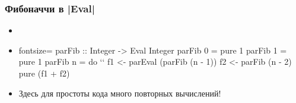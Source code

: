 \documentclass[11pt]{beamer}
\begin{document}
\begin{frame}[fragile]
  \frametitle{Фибоначчи в \haskinline|Eval|}
  \begin{itemize}
    \item
          \pause
    \item
          \begin{haskell*}{fontsize=\footnotesize}
            parFib :: Integer -> Eval Integer
            parFib 0 = pure 1
            parFib 1 = pure 1
            parFib n = do `\pause`
            f1 <- parEval (parFib (n - 1))
            f2 <- parFib (n - 2)
            pure (f1 + f2)
          \end{haskell*}
          \pause
    \item Здесь для простоты кода много повторных вычислений!
  \end{itemize}
\end{frame}

\end{document}
